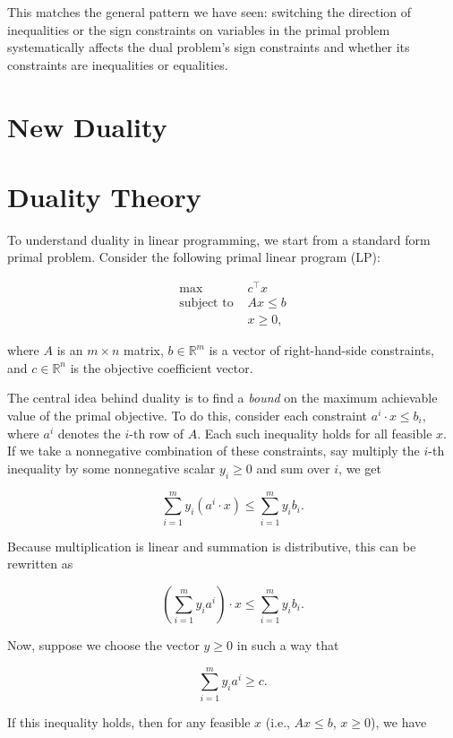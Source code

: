 This matches the general pattern we have seen: switching the direction of inequalities or the sign constraints on variables in the primal problem systematically affects the dual problem's sign constraints and whether its constraints are inequalities or equalities.





\newpage

\newpage
\section{New Duality}
\section{Duality Theory}

To understand duality in linear programming, we start from a standard form primal problem. Consider the following primal linear program (LP):

\[
\begin{aligned}
\max \; & c^\top x \\
\text{subject to } & A x \leq b \\
& x \geq 0,
\end{aligned}
\]

where $A$ is an $m \times n$ matrix, $b \in \mathbb{R}^m$ is a vector of right-hand-side constraints, and $c \in \mathbb{R}^n$ is the objective coefficient vector.

The central idea behind duality is to find a \emph{bound} on the maximum achievable value of the primal objective. To do this, consider each constraint $a^i \cdot x \leq b_i$, where $a^i$ denotes the $i$-th row of $A$. Each such inequality holds for all feasible $x$. If we take a nonnegative combination of these constraints, say multiply the $i$-th inequality by some nonnegative scalar $y_i \geq 0$ and sum over $i$, we get

\[
\sum_{i=1}^m y_i (a^i \cdot x) \leq \sum_{i=1}^m y_i b_i.
\]

Because multiplication is linear and summation is distributive, this can be rewritten as

\[
(\sum_{i=1}^m y_i a^i) \cdot x \leq \sum_{i=1}^m y_i b_i.
\]

Now, suppose we choose the vector $y \geq 0$ in such a way that

\[
\sum_{i=1}^m y_i a^i \geq c.
\]

If this inequality holds, then for any feasible $x$ (i.e., $A x \leq b$, $x \geq 0$), we have

